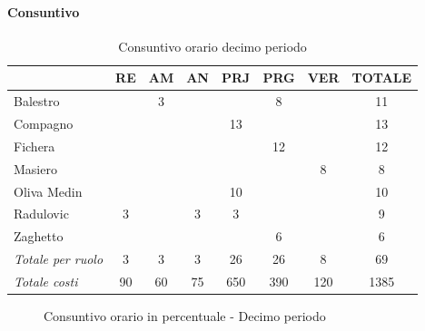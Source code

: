 \documentclass[a4paper,12pt]{article}
\begin{document}
            \paragraph{Consuntivo}
                \begin{table}[H]
                \centering
                \caption{Consuntivo orario decimo periodo}
                \begin{tabular}{|l|c|c|c|c|c|c|c|}
                \hline
                    \rowcolor{lightgray}{\textbf{Membro}} & {\textbf{RE}} & {\textbf{AM}} & {\textbf{AN}} & {\textbf{PRJ}} & {\textbf{PRG}} & {\textbf{VER}} & {\textbf{TOTALE}}\\
                \hline
                    Balestro & & 3 & & & 8 & & 11\\
                \hline
                    Compagno & & & & 13 & & & 13\\
                \hline
                    Fichera & & & & & 12 & & 12\\
                \hline
                    Masiero & & & & & & 8 & 8\\
                \hline
                    Oliva Medin & & & & 10 & & & 10\\
                \hline
                    Radulovic & 3 & & 3 & 3 & & & 9\\
                \hline
                    Zaghetto & & & & & 6 & & 6\\
                \hline
                    \rowcolor{lightgray}\textit{Totale per ruolo} & 3 & 3 & 3 & 26 & 26 & 8 & 69\\
                \hline
                    \rowcolor{lightgray}\textit{Totale costi} & 90 & 60 & 75 & 650 & 390 & 120 & 1385\\
                \hline
                \end{tabular}
                \end{table}

                \begin{figure}[H]
                \centering
                \caption{Consuntivo orario in percentuale - Decimo periodo}
                \end{figure}
                
\end{document}
